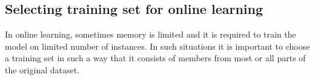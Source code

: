\begin{table}[!t]
\centering
\caption{\label{comp_wiki} Rank correlation of community detection algorithms based on the performance on the sample (generated from individual sampling methods) and the original graph. (b) Performance of SVM using the training set obtained from sampling methods.}
\end{table}


\subsection{Selecting training set for online learning}

In online learning, sometimes memory is limited and it is required to train the model on limited number of instances. In such situations it is important to choose a training set in such a way that it consists of members from most or all parts of the original dataset.


